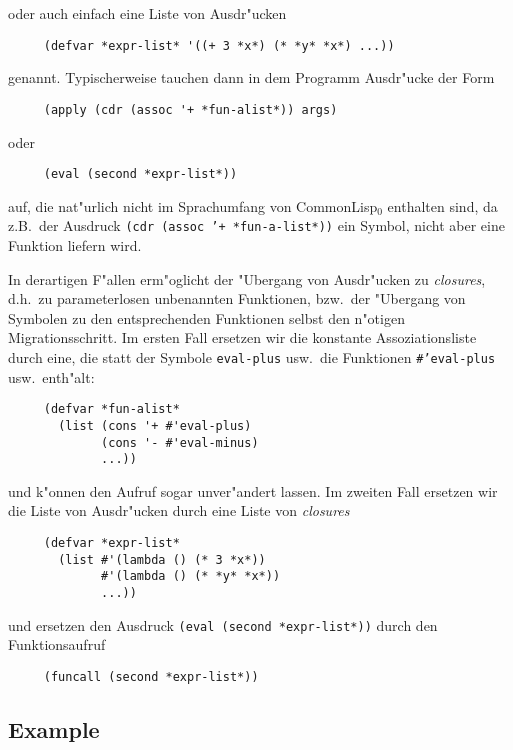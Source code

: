 oder auch einfach eine Liste von Ausdr"ucken

\begin{verbatim}
     (defvar *expr-list* '((+ 3 *x*) (* *y* *x*) ...))
\end{verbatim}

genannt. Typischerweise tauchen dann in dem Programm Ausdr"ucke der
Form

\begin{verbatim}
     (apply (cdr (assoc '+ *fun-alist*)) args)
\end{verbatim}

oder

\begin{verbatim}
     (eval (second *expr-list*))
\end{verbatim}

auf, die nat"urlich nicht im Sprachumfang von CommonLisp$_0$ enthalten
sind, da z.B.\ der Ausdruck {\tt (cdr (assoc '+ *fun-a-list*))} ein
Symbol, nicht aber eine Funktion liefern wird.

In derartigen F"allen erm"oglicht der "Ubergang von Ausdr"ucken zu
{\em closures}, d.h.\ zu parameterlosen unbenannten Funktionen, bzw.\
der "Ubergang von Symbolen zu den entsprechenden Funktionen selbst den
n"otigen Migrationsschritt. Im ersten Fall ersetzen wir die konstante
Assoziationsliste durch eine, die statt der Symbole {\tt eval-plus}
usw.\ die Funktionen {\tt \#'eval-plus} usw.\ enth"alt:

\begin{verbatim}
     (defvar *fun-alist*
       (list (cons '+ #'eval-plus)
             (cons '- #'eval-minus)
             ...))
\end{verbatim}

und k"onnen den Aufruf sogar unver"andert lassen. Im zweiten Fall
ersetzen wir die Liste von Ausdr"ucken durch eine Liste von {\em
closures}
\begin{verbatim}
     (defvar *expr-list*
       (list #'(lambda () (* 3 *x*))
             #'(lambda () (* *y* *x*))
             ...))
\end{verbatim}

und ersetzen den Ausdruck {\tt (eval (second *expr-list*))} durch den
Funktionsaufruf 
\begin{verbatim}
     (funcall (second *expr-list*))
\end{verbatim}


\subsection{Example}

